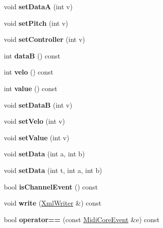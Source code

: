 \begin{DoxyCompactItemize}
void {\bfseries set\+DataA} (int v)
\item 
\mbox{\label{class_ms_1_1_midi_core_event_ad21731251a964c63d00cfb214afe6f69}} 
void {\bfseries set\+Pitch} (int v)
\item 
\mbox{\label{class_ms_1_1_midi_core_event_aed837a74450dc70ba91e00d14bffd965}} 
void {\bfseries set\+Controller} (int v)
\item 
\mbox{\label{class_ms_1_1_midi_core_event_ae0236873fa00fc79271f494aa117fef9}} 
int {\bfseries dataB} () const
\item 
\mbox{\label{class_ms_1_1_midi_core_event_a05a66d9963afeb534a228147fac0e45d}} 
int {\bfseries velo} () const
\item 
\mbox{\label{class_ms_1_1_midi_core_event_af59a899200412ea60248e3de3eab1cb9}} 
int {\bfseries value} () const
\item 
\mbox{\label{class_ms_1_1_midi_core_event_aaa26930679055ec08941bd72afd6140b}} 
void {\bfseries set\+DataB} (int v)
\item 
\mbox{\label{class_ms_1_1_midi_core_event_a299f7e0364b91283da904b2dd70a64c4}} 
void {\bfseries set\+Velo} (int v)
\item 
\mbox{\label{class_ms_1_1_midi_core_event_a95c7277ac742df0885650ed155b46a30}} 
void {\bfseries set\+Value} (int v)
\item 
\mbox{\label{class_ms_1_1_midi_core_event_a0a726f8872a4401e8c98cd1b3d1db07d}} 
void {\bfseries set\+Data} (int a, int b)
\item 
\mbox{\label{class_ms_1_1_midi_core_event_a942bf27c097e80a9bacab5589e6ba7dd}} 
void {\bfseries set\+Data} (int t, int a, int b)
\item 
\mbox{\label{class_ms_1_1_midi_core_event_aae66130bece0f658c8e977df88e8eca8}} 
bool {\bfseries is\+Channel\+Event} () const
\item 
\mbox{\label{class_ms_1_1_midi_core_event_ade5b9622150756221daa8583a7dbf1d2}} 
void {\bfseries write} (\hyperlink{class_ms_1_1_xml_writer}{Xml\+Writer} \&) const
\item 
\mbox{\label{class_ms_1_1_midi_core_event_afaec3dd9326ff065e1f5c456260409a4}} 
bool {\bfseries operator==} (const \hyperlink{class_ms_1_1_midi_core_event}{Midi\+Core\+Event} \&e) const
\end{DoxyCompactItemize}

